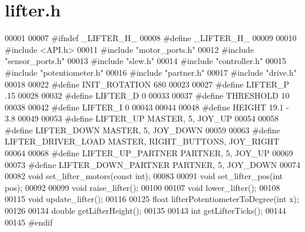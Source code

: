 \section{lifter.\+h}
\label{lifter_8h_source}

\begin{DoxyCode}
00001 
00007 \textcolor{preprocessor}{#ifndef \_LIFTER\_H\_}
00008 \textcolor{preprocessor}{#define \_LIFTER\_H\_}
00009 
00010 \textcolor{preprocessor}{#include <API.h>}
00011 \textcolor{preprocessor}{#include "motor_ports.h"}
00012 \textcolor{preprocessor}{#include "sensor_ports.h"}
00013 \textcolor{preprocessor}{#include "slew.h"}
00014 \textcolor{preprocessor}{#include "controller.h"}
00015 \textcolor{preprocessor}{#include "potentiometer.h"}
00016 \textcolor{preprocessor}{#include "partner.h"}
00017 \textcolor{preprocessor}{#include "drive.h"}
00018 
00022 \textcolor{preprocessor}{#define INIT\_ROTATION 680}
00023 
00027 \textcolor{preprocessor}{#define LIFTER\_P .15}
00028 
00032 \textcolor{preprocessor}{#define LIFTER\_D 0}
00033 
00037 \textcolor{preprocessor}{#define THRESHOLD 10}
00038 
00042 \textcolor{preprocessor}{#define LIFTER\_I 0}
00043 
00044 
00048 \textcolor{preprocessor}{#define HEIGHT 19.1 - 3.8}
00049 
00053 \textcolor{preprocessor}{#define LIFTER\_UP MASTER, 5, JOY\_UP}
00054 
00058 \textcolor{preprocessor}{#define LIFTER\_DOWN MASTER, 5, JOY\_DOWN}
00059 
00063 \textcolor{preprocessor}{#define LIFTER\_DRIVER\_LOAD MASTER, RIGHT\_BUTTONS, JOY\_RIGHT}
00064 
00068 \textcolor{preprocessor}{#define LIFTER\_UP\_PARTNER PARTNER, 5, JOY\_UP}
00069 
00073 \textcolor{preprocessor}{#define LIFTER\_DOWN\_PARTNER PARTNER, 5, JOY\_DOWN}
00074 
00082 \textcolor{keywordtype}{void} set_lifter_motors(\textcolor{keyword}{const} \textcolor{keywordtype}{int});
00083 
00091 \textcolor{keywordtype}{void} set_lifter_pos(\textcolor{keywordtype}{int} pos);
00092 
00099 \textcolor{keywordtype}{void} raise_lifter();
00100 
00107 \textcolor{keywordtype}{void} lower_lifter();
00108 
00115 \textcolor{keywordtype}{void} update_lifter();
00116 
00125 \textcolor{keywordtype}{float} lifterPotentiometerToDegree(\textcolor{keywordtype}{int} x);
00126 
00134 \textcolor{keywordtype}{double} getLifterHeight();
00135 
00143 \textcolor{keywordtype}{int} getLifterTicks();
00144 
00145 \textcolor{preprocessor}{#endif}
\end{DoxyCode}
